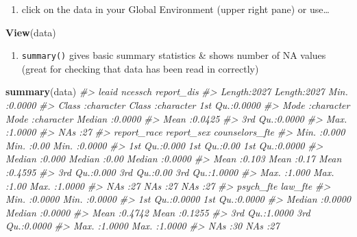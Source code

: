 \documentclass[
]{book}
\newenvironment{Shaded}{\begin{snugshade}}{\end{snugshade}}
\newcommand{\CommentTok}[1]{\textcolor[rgb]{0.56,0.35,0.01}{\textit{#1}}}
\newcommand{\FunctionTok}[1]{\textcolor[rgb]{0.13,0.29,0.53}{\textbf{#1}}}
\newcommand{\NormalTok}[1]{#1}
\providecommand{\tightlist}{%
  \setlength{\itemsep}{0pt}\setlength{\parskip}{0pt}}
\begin{document}
\begin{enumerate}
\def\labelenumi{\arabic{enumi}.}
\tightlist
\item
  click on the data in your Global Environment (upper right pane) or use\ldots{}
\end{enumerate}

\begin{Shaded}
\begin{Highlighting}[]
\FunctionTok{View}\NormalTok{(data)}
\end{Highlighting}
\end{Shaded}

\begin{enumerate}
\def\labelenumi{\arabic{enumi}.}
\setcounter{enumi}{1}
\tightlist
\item
  \texttt{summary()} gives basic summary statistics \& shows number of NA values (great for checking that data has been read in correctly)
\end{enumerate}

\begin{Shaded}
\begin{Highlighting}[]
\FunctionTok{summary}\NormalTok{(data)}
\CommentTok{\#\textgreater{}     leaid             ncessch            report\_dis    }
\CommentTok{\#\textgreater{}  Length:2027        Length:2027        Min.   :0.0000  }
\CommentTok{\#\textgreater{}  Class :character   Class :character   1st Qu.:0.0000  }
\CommentTok{\#\textgreater{}  Mode  :character   Mode  :character   Median :0.0000  }
\CommentTok{\#\textgreater{}                                        Mean   :0.0425  }
\CommentTok{\#\textgreater{}                                        3rd Qu.:0.0000  }
\CommentTok{\#\textgreater{}                                        Max.   :1.0000  }
\CommentTok{\#\textgreater{}                                        NA\textquotesingle{}s   :27      }
\CommentTok{\#\textgreater{}   report\_race      report\_sex   counselors\_fte  }
\CommentTok{\#\textgreater{}  Min.   :0.000   Min.   :0.00   Min.   :0.0000  }
\CommentTok{\#\textgreater{}  1st Qu.:0.000   1st Qu.:0.00   1st Qu.:0.0000  }
\CommentTok{\#\textgreater{}  Median :0.000   Median :0.00   Median :0.0000  }
\CommentTok{\#\textgreater{}  Mean   :0.103   Mean   :0.17   Mean   :0.4595  }
\CommentTok{\#\textgreater{}  3rd Qu.:0.000   3rd Qu.:0.00   3rd Qu.:1.0000  }
\CommentTok{\#\textgreater{}  Max.   :1.000   Max.   :1.00   Max.   :1.0000  }
\CommentTok{\#\textgreater{}  NA\textquotesingle{}s   :27      NA\textquotesingle{}s   :27     NA\textquotesingle{}s   :27      }
\CommentTok{\#\textgreater{}    psych\_fte         law\_fte      }
\CommentTok{\#\textgreater{}  Min.   :0.0000   Min.   :0.0000  }
\CommentTok{\#\textgreater{}  1st Qu.:0.0000   1st Qu.:0.0000  }
\CommentTok{\#\textgreater{}  Median :0.0000   Median :0.0000  }
\CommentTok{\#\textgreater{}  Mean   :0.4742   Mean   :0.1255  }
\CommentTok{\#\textgreater{}  3rd Qu.:1.0000   3rd Qu.:0.0000  }
\CommentTok{\#\textgreater{}  Max.   :1.0000   Max.   :1.0000  }
\CommentTok{\#\textgreater{}  NA\textquotesingle{}s   :30       NA\textquotesingle{}s   :27}
\end{Highlighting}
\end{Shaded}
\end{document}
